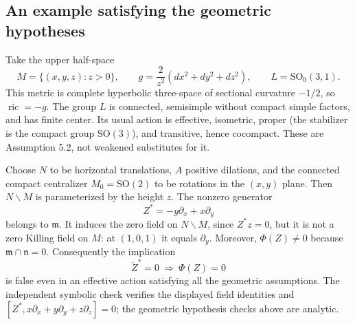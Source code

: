 \documentclass[10pt]{article}
\begin{document}
\subsection*{An example satisfying the geometric hypotheses}
Take the upper half-space \[M=\{(x,y,z):z>0\},\qquad
 g=\frac{2}{z^2}(dx^2+dy^2+dz^2),\qquad L=\mathrm{SO}_0(3,1).\] This metric is complete hyperbolic three-space of sectional curvature \(-1/2\), so \(\operatorname{ric}=-g\). The group \(L\) is connected, semisimple without compact simple factors, and has finite center. Its usual action is effective, isometric, proper (the stabilizer is the compact group \(\mathrm{SO}(3)\)), and transitive, hence cocompact. These are Assumption 5.2, not weakened substitutes for it.\par
Choose \(N\) to be horizontal translations, \(A\) positive dilations, and the connected compact centralizer \(M_0=\mathrm{SO}(2)\) to be rotations in the \((x,y)\) plane. Then \(N\backslash M\) is parameterized by the height \(z\). The nonzero generator \[Z^{*}=-y\partial_x+x\partial_y\] belongs to \(\mathfrak m\). It induces the zero field on \(N\backslash M\), since \(Z^{*}z=0\), but it is not a zero Killing field on \(M\): at \((1,0,1)\) it equals \(\partial_y\). Moreover, \(\Phi(Z)\ne0\) because \(\mathfrak m\cap\mathfrak n=0\). Consequently the implication \[\check Z^{*}=0\ \Longrightarrow\ \Phi(Z)=0\] is false even in an effective action satisfying all the geometric assumptions. The independent symbolic check verifies the displayed field identities and \([Z^{*},x\partial_x+y\partial_y+z\partial_z]=0\); the geometric hypothesis checks above are analytic.\par
\end{document}
